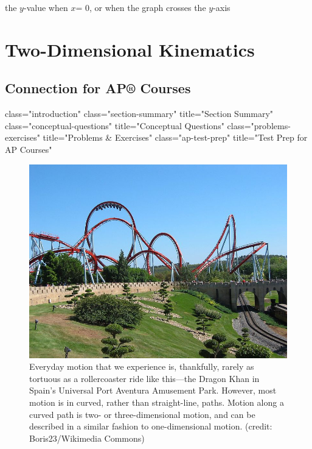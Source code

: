 \documentclass[
]{book}
\providecommand{\tightlist}{%
  \setlength{\itemsep}{0pt}\setlength{\parskip}{0pt}}
\begin{document}
\begin{description}
\tightlist
\item[y-intercept]
the \({y\text{-}}{}\)value when \(x{}\)\emph{}=
0, or when the graph crosses the \(y{}\)-axis
\end{description}

\hypertarget{two-dimensional-kinematics}{%
\chapter{Two-Dimensional Kinematics}\label{two-dimensional-kinematics}}

\hypertarget{connection-for-ap-courses-1}{%
\section{Connection for AP® Courses}\label{connection-for-ap-courses-1}}

class="introduction"
class="section-summary"
title="Section Summary"
class="conceptual-questions"
title="Conceptual Questions"
class="problems-exercises"
title="Problems \& Exercises"
class="ap-test-prep" title="Test
Prep for AP Courses"

\begin{figure}
\hypertarget{import-auto-id1165298827978}{%
\centering
\includegraphics{images/Figure_03_00_01a.jpg}
\caption{Everyday motion that we experience is, thankfully, rarely as tortuous
as a rollercoaster ride like this---the Dragon Khan in Spain's
Universal Port Aventura Amusement Park. However, most motion is in
curved, rather than straight-line, paths. Motion along a curved path is
two- or three-dimensional motion, and can be described in a similar
fashion to one-dimensional motion. (credit: Boris23/Wikimedia
Commons)}\label{import-auto-id1165298827978}
}
\end{figure}
\end{document}
